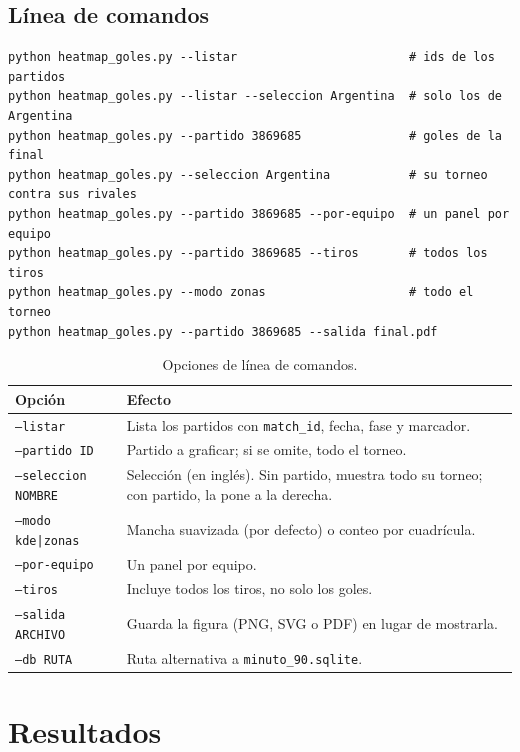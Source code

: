 \documentclass[11pt,a4paper]{article}
\begin{document}
\subsection{Línea de comandos}

\begin{lstlisting}
python heatmap_goles.py --listar                        # ids de los partidos
python heatmap_goles.py --listar --seleccion Argentina  # solo los de Argentina
python heatmap_goles.py --partido 3869685               # goles de la final
python heatmap_goles.py --seleccion Argentina           # su torneo contra sus rivales
python heatmap_goles.py --partido 3869685 --por-equipo  # un panel por equipo
python heatmap_goles.py --partido 3869685 --tiros       # todos los tiros
python heatmap_goles.py --modo zonas                    # todo el torneo
python heatmap_goles.py --partido 3869685 --salida final.pdf
\end{lstlisting}

\begin{table}[H]
\centering
\begin{tabular}{@{}lp{10cm}@{}}
\toprule
Opción & Efecto \\
\midrule
\texttt{--listar}           & Lista los partidos con \texttt{match\_id}, fecha, fase y marcador. \\
\texttt{--partido ID}       & Partido a graficar; si se omite, todo el torneo. \\
\texttt{--seleccion NOMBRE} & Selección (en inglés). Sin partido, muestra todo su torneo; con partido, la pone a la derecha. \\
\texttt{--modo kde|zonas}   & Mancha suavizada (por defecto) o conteo por cuadrícula. \\
\texttt{--por-equipo}       & Un panel por equipo. \\
\texttt{--tiros}            & Incluye todos los tiros, no solo los goles. \\
\texttt{--salida ARCHIVO}   & Guarda la figura (PNG, SVG o PDF) en lugar de mostrarla. \\
\texttt{--db RUTA}          & Ruta alternativa a \texttt{minuto\_90.sqlite}. \\
\bottomrule
\end{tabular}
\caption{Opciones de línea de comandos.}
\end{table}

\section{Resultados}
\end{document}
